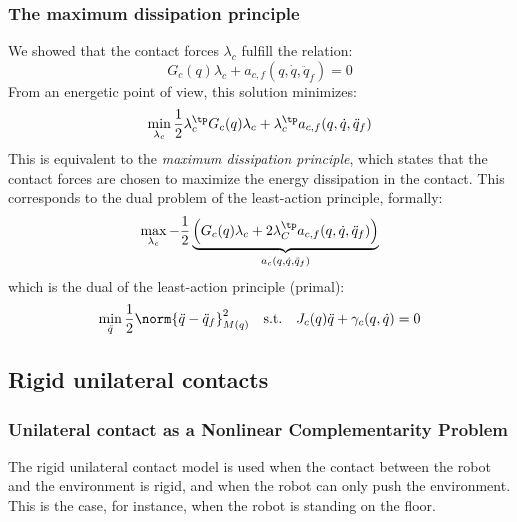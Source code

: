 \subsubsection{The maximum dissipation principle}
We showed that the contact forces $\lambda_c$ fulfill the relation:
\begin{equation*}
    G_c(q)\lambda_c + a_{c, f}(q, \dot{q}, \ddot{q}_f) = 0
\end{equation*}
From an energetic point of view, this solution minimizes:
\begin{equation*}
    \min_{\lambda_c} \frac{1}{2}\lambda_c^\tp G_c(q)\lambda_c + \lambda_c^\tp a_{c, f}(q, \dot{q}, \ddot{q}_f)
\end{equation*}
This is equivalent to the \emph{maximum dissipation principle}, which states that the contact forces are chosen to maximize the energy dissipation in the contact. This corresponds to the dual problem of the least-action principle, formally:
\begin{equation*}
    \max_{\lambda_c} -\frac{1}{2}\underbrace{
        \left(
            G_c(q)\lambda_c+2\lambda_C^\tp a_{c, f}(q, \dot{q}, \ddot{q}_f)
        \right)
    }_{a_c(q, \dot{q}, \ddot{q}_f)}
\end{equation*}
which is the dual of the least-action principle (primal):
\begin{equation*}
    \min_{\ddot{q}} \frac{1}{2}\norm{\ddot{q}-\ddot{q}_f}^2_{M(q)} \quad\text{s.t.}\quad J_c(q)\ddot{q} + \gamma_c(q, \dot{q}) = 0
\end{equation*}

\subsection{Rigid unilateral contacts}
\subsubsection{Unilateral contact as a Nonlinear Complementarity Problem}
The rigid unilateral contact model is used when the contact between the robot and the environment is rigid, and when the robot can only push the environment. This is the case, for instance, when the robot is standing on the floor. 

